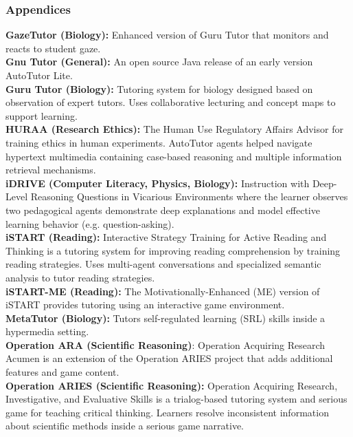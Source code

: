 \documentclass{beamer}
\begin{document}
\begin{frame}
\frametitle{Appendices}
{\tiny 
	\textbf{GazeTutor (Biology):} Enhanced version of Guru Tutor that monitors and reacts to student gaze.\\
	\textbf{Gnu Tutor (General):} An open source Java release of an early version AutoTutor Lite.\\
\textbf{Guru Tutor (Biology):} Tutoring system for biology designed based on observation of
expert tutors. Uses collaborative lecturing and concept maps to support
learning.\\
\textbf{HURAA (Research Ethics):} The Human Use Regulatory Affairs Advisor for training
ethics in human experiments. AutoTutor agents helped navigate hypertext
multimedia containing case-based reasoning and multiple information retrieval
mechanisms.\\
\textbf{iDRIVE (Computer Literacy, Physics, Biology): }Instruction with Deep-Level Reasoning Questions in Vicarious Environments where the learner observes two
pedagogical agents demonstrate deep explanations and model effective learning behavior (e.g. question-asking).\\
\textbf{iSTART (Reading): }Interactive Strategy Training for Active Reading and Thinking is a
tutoring system for improving reading comprehension by training reading
strategies. Uses multi-agent conversations and specialized semantic analysis
to tutor reading strategies.\\
\textbf{iSTART-ME (Reading):} The Motivationally-Enhanced (ME) version of iSTART
provides tutoring using an interactive game environment.\\
\textbf{MetaTutor (Biology):} Tutors self-regulated learning (SRL) skills inside a hypermedia
setting.\\
\textbf{Operation ARA (Scientific Reasoning)}: Operation Acquiring Research Acumen is an
extension of the Operation ARIES project that adds additional features and
game content.\\
\textbf{Operation ARIES (Scientific Reasoning):} Operation Acquiring Research, Investigative, and Evaluative Skills is a trialog-based tutoring system and serious game
for teaching critical thinking. Learners resolve inconsistent information about
scientific methods inside a serious game narrative.\\}
\end{frame}
\end{document}
